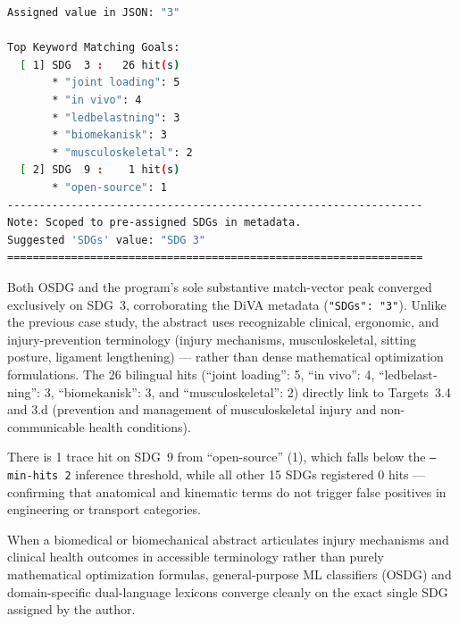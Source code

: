 \begin{casestudySection}
\begin{lstlisting}[language={bash}, basicstyle=\footnotesize, escapechar=|, breaklines=true,
    postbreak=\usebox{\lstbreakbox}, caption={Program's output}, label=lst:t_150695Output]
Assigned value in JSON: "3"

Top Keyword Matching Goals:
  [ 1] SDG  3 :   26 hit(s)
       * "joint loading": 5
       * "in vivo": 4
       * "ledbelastning": 3
       * "biomekanisk": 3
       * "musculoskeletal": 2
  [ 2] SDG  9 :    1 hit(s)
       * "open-source": 1
-----------------------------------------------------------------
Note: Scoped to pre-assigned SDGs in metadata.
Suggested 'SDGs' value: "SDG 3"
=================================================================
\end{lstlisting}

Both OSDG and the program's sole substantive match-vector peak converged exclusively on \gls{SDG}~3, corroborating the \gls{DiVA} metadata (\texttt{"SDGs": "3"}).
Unlike the previous case study, the abstract uses recognizable clinical, ergonomic, and injury-prevention terminology (injury mechanisms, musculoskeletal, sitting posture, ligament lengthening) --- rather than dense mathematical optimization formulations. The \num{26} bilingual hits (\enquote{joint loading}: 5, \enquote{in vivo}: 4, \enquote{\foreignlanguage{swedish}{ledbelastning}}: 3, \enquote{\foreignlanguage{swedish}{biomekanisk}}: 3, and \enquote{musculoskeletal}: 2) directly link to Targets~3.4 and 3.d (prevention and management of musculoskeletal injury and non-communicable health conditions).

There is \num{1} trace hit on \gls{SDG}~9 from \enquote{open-source} (1), which falls below the \texttt{--min-hits 2} inference threshold, while all other \num{15} \glspl{SDG} registered \num{0} hits --- confirming that anatomical and kinematic terms do not trigger false positives in engineering or transport categories.
\end{casestudySection}

\begin{takeaway}
When a biomedical or biomechanical abstract articulates injury mechanisms and clinical health outcomes in accessible terminology rather than purely mathematical optimization formulas, general-purpose \gls{ML} classifiers (OSDG) and domain-specific dual-language lexicons converge cleanly on the exact single \gls{SDG} assigned by the author.
\end{takeaway}

